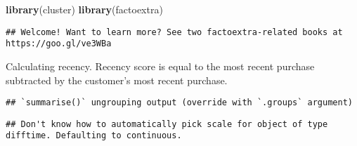 \documentclass[]{article}
\newenvironment{Shaded}{\begin{snugshade}}{\end{snugshade}}
\newcommand{\CommentTok}[1]{\textcolor[rgb]{0.56,0.35,0.01}{\textit{#1}}}
\newcommand{\DataTypeTok}[1]{\textcolor[rgb]{0.13,0.29,0.53}{#1}}
\newcommand{\KeywordTok}[1]{\textcolor[rgb]{0.13,0.29,0.53}{\textbf{#1}}}
\newcommand{\NormalTok}[1]{#1}
\newcommand{\OperatorTok}[1]{\textcolor[rgb]{0.81,0.36,0.00}{\textbf{#1}}}
\newcommand{\StringTok}[1]{\textcolor[rgb]{0.31,0.60,0.02}{#1}}
\begin{document}
\begin{Shaded}
\begin{Highlighting}[]
\KeywordTok{library}\NormalTok{(cluster)}
\KeywordTok{library}\NormalTok{(factoextra)}
\end{Highlighting}
\end{Shaded}

\begin{verbatim}
## Welcome! Want to learn more? See two factoextra-related books at https://goo.gl/ve3WBa
\end{verbatim}

Calculating recency. Recency score is equal to the most recent purchase
subtracted by the customer's most recent purchase.

\begin{Shaded}
\end{Shaded}

\begin{verbatim}
## `summarise()` ungrouping output (override with `.groups` argument)
\end{verbatim}

\begin{Shaded}
\end{Shaded}

\begin{verbatim}
## Don't know how to automatically pick scale for object of type difftime. Defaulting to continuous.
\end{verbatim}
\end{document}
